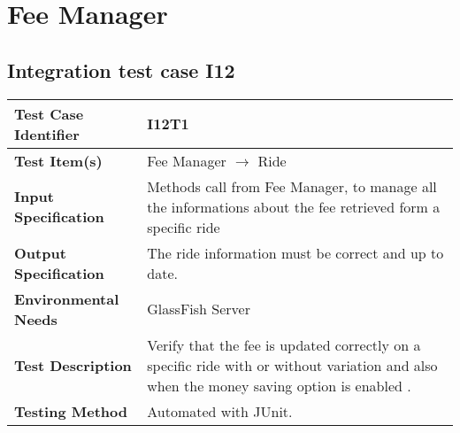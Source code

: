 \section{ Fee Manager}
\subsection{Integration test case I12}

\begin{tabular}{l p{}}
    \hline
    \textbf{Test Case Identifier} & I12T1\\
    \hline
    \textbf{Test Item(s)} & Fee Manager $\rightarrow$ Ride\\
    \hline
    \textbf{Input Specification} & Methods call from Fee Manager, to manage all the informations about the fee retrieved form a specific ride \\
    \hline
    \textbf{Output Specification} & The ride information must be correct and up to date.\\
    \hline
    \textbf{Environmental Needs} &  GlassFish Server\\
    \hline
    \textbf{Test Description} & Verify that the fee is updated correctly on a specific ride with or without variation and also when the money saving option is enabled   .\\
    \hline
    \textbf{Testing Method} & Automated with JUnit.\\
    \hline
\end{tabular}

